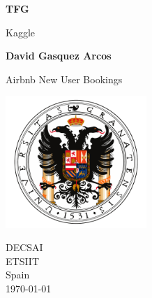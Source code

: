 \begin{titlepage}
    \begin{center}

        \Huge\textbf{TFG}

        \vspace{0.4cm}

        \LARGE Kaggle

        \vspace{1.0cm}

        \textbf{David Gasquez Arcos}

        \vfill

        Airbnb New User Bookings

        \vspace{0.8cm}

        \includegraphics[width=0.4\textwidth]{images/university_logo.png}

        \Large
        DECSAI\\
        ETSIIT\\
        Spain\\
        \today

    \end{center}
\end{titlepage}

